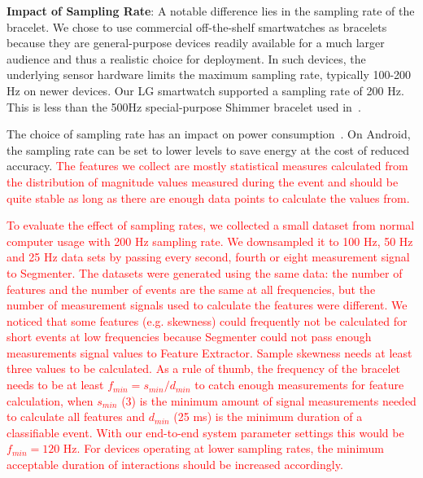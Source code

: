 \documentclass[conference]{IEEEtran}
\newcommand\changeMika[1]{\textcolor{red}{#1}}
\newcommand\changeMika[1]{{#1}}
\begin{document}
\vspace{1mm}
\noindent\textbf{Impact of Sampling Rate}: 
A notable difference lies in the sampling rate of the bracelet. We chose to use
commercial off-the-shelf smartwatches as bracelets because they are general-purpose devices readily available for a much larger audience and thus a realistic choice for deployment.
In such devices, the underlying sensor hardware limits the maximum sampling rate, typically 100-200 Hz on newer devices. Our LG smartwatch supported a sampling rate of 200 Hz. This is less than the 500Hz special-purpose Shimmer bracelet used in~\cite{mare2014zebra}.

The choice of sampling rate has an impact on power consumption~\cite{DBLP:conf/huc/BrajdicH13}. 
On Android, the sampling rate can be set to lower levels to save energy at the cost of reduced accuracy. 
\changeMika{The features we collect are mostly statistical measures calculated from the distribution of magnitude values measured during the event and should be quite stable as long as there are enough data points to calculate the values from. }

\changeMika{To evaluate the effect of sampling rates, we collected a small dataset from normal computer usage with 200 Hz sampling rate. We downsampled it to 100 Hz, 50 Hz and 25 Hz data sets by passing every second, fourth or eight measurement signal to Segmenter. 
The datasets were generated using the same data: the number of features and the number of events are the same at all frequencies, but the number of measurement signals used to calculate the features were different. 
We noticed that some features (e.g. skewness) could frequently not be calculated for short events at low frequencies because Segmenter could not pass enough measurements signal values to Feature Extractor. Sample skewness needs at least three values to be calculated. As a rule of thumb, the frequency of the bracelet needs to be at least $f_{min} = s_{min} / d_{min}$ to catch enough measurements for feature calculation, when $s_{min}$ (3) is the minimum amount of signal measurements needed to calculate all features and $d_{min}$ (25 ms) is the minimum duration of a classifiable event. With our end-to-end system parameter settings this would be $f_{min} = 120$ Hz.}
\changeMika{For devices operating at lower sampling rates, the minimum acceptable duration of interactions should be increased accordingly.}
\end{document}
